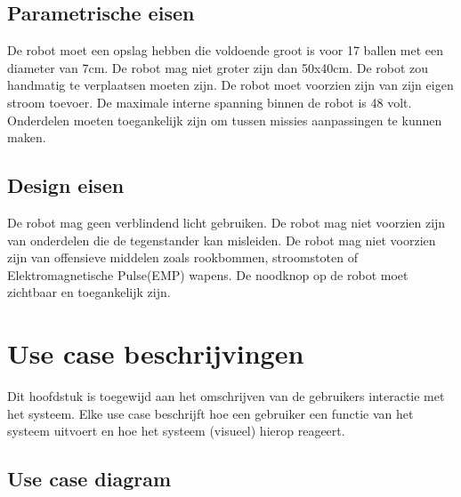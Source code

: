 \documentclass[12pt]{article} %
\begin{document}
\subsection{Parametrische eisen}
\begin{enumerate}
 De robot moet een opslag hebben die voldoende groot is voor 17 ballen met een diameter van 7cm.
 De robot mag niet groter zijn dan 50x40cm.
 De robot zou handmatig te verplaatsen moeten zijn. 
 De robot moet voorzien zijn van zijn eigen stroom toevoer.
 De maximale interne spanning binnen de robot is 48 volt.
 Onderdelen moeten toegankelijk zijn om tussen missies aanpassingen te kunnen maken.
\end{enumerate}
\newpage

\subsection{Design eisen}
\begin{enumerate}
 De robot mag geen verblindend licht gebruiken.
 De robot mag niet voorzien zijn van onderdelen die de tegenstander kan misleiden.
 De robot mag niet voorzien zijn van offensieve middelen zoals rookbommen, stroomstoten of Elektromagnetische Pulse(EMP) wapens.
 De noodknop op de robot moet zichtbaar en toegankelijk zijn.
\end{enumerate}
\newpage

\section{Use case beschrijvingen}
Dit hoofdstuk is toegewijd aan het omschrijven van de gebruikers interactie met het systeem. Elke use case beschrijft hoe een gebruiker een functie van het systeem uitvoert en hoe het systeem (visueel) hierop reageert.

\subsection{Use case diagram}
\end{document}
